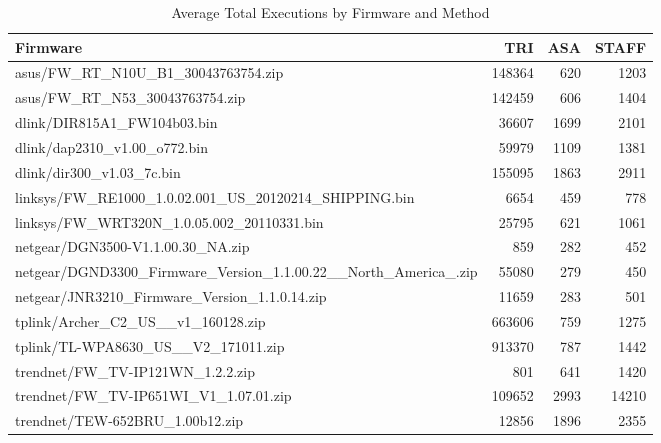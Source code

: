 \begin{table}[htbp]
\centering
\caption{Average Total Executions by Firmware and Method}
\label{tab:total_execs}
\begin{tabular}{lrrr}
\toprule
Firmware & TRI & ASA & STAFF \\
\midrule
asus/FW_RT_N10U_B1_30043763754.zip & 148364 & 620 & 1203 \\
asus/FW_RT_N53_30043763754.zip & 142459 & 606 & 1404 \\
dlink/DIR815A1_FW104b03.bin & 36607 & 1699 & 2101 \\
dlink/dap2310_v1.00_o772.bin & 59979 & 1109 & 1381 \\
dlink/dir300_v1.03_7c.bin & 155095 & 1863 & 2911 \\
linksys/FW_RE1000_1.0.02.001_US_20120214_SHIPPING.bin & 6654 & 459 & 778 \\
linksys/FW_WRT320N_1.0.05.002_20110331.bin & 25795 & 621 & 1061 \\
netgear/DGN3500-V1.1.00.30_NA.zip & 859 & 282 & 452 \\
netgear/DGND3300_Firmware_Version_1.1.00.22__North_America_.zip & 55080 & 279 & 450 \\
netgear/JNR3210_Firmware_Version_1.1.0.14.zip & 11659 & 283 & 501 \\
tplink/Archer_C2_US__v1_160128.zip & 663606 & 759 & 1275 \\
tplink/TL-WPA8630_US__V2_171011.zip & 913370 & 787 & 1442 \\
trendnet/FW_TV-IP121WN_1.2.2.zip & 801 & 641 & 1420 \\
trendnet/FW_TV-IP651WI_V1_1.07.01.zip & 109652 & 2993 & 14210 \\
trendnet/TEW-652BRU_1.00b12.zip & 12856 & 1896 & 2355 \\
\bottomrule
\end{tabular}
\end{table}
